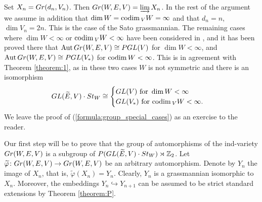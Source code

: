 \documentclass[11pt, a4paper]{article}
\begin{document}
 Set $X_n=Gr(d_n,V_n)$. Then $Gr(W,E,V)=\varinjlim X_n$. In the rest of the argument we assume in addition that $\dim W=\mathrm{codim}\,_V W=\infty$ and that $d_n=n$, $\dim V_n=2n$. This is the case of the Sato grassmannian. The remaining cases where $\dim W<\infty$ or $\mathrm{codim}\,_V W<\infty$ have been considered in \cite{Penkov}, and it has been proved there that $\mathrm{Aut}\,Gr(W,E,V)\cong P GL(V)$ for $\dim W<\infty$, and $\mathrm{Aut}\,Gr(W,E,V)\cong P GL(V_*)$ for $\mathrm{codim}\, W<\infty$. This is in agreement with Theorem \ref{theorem:1}, as in these two cases $W$ is not symmetric and there is an isomorphism \begin{equation}\label{formula:group_special_cases}
     GL(\widetilde{E},V)\cdot St_W \cong\begin{cases} GL(V) \text{ for } \dim W<\infty \\ GL(V_*) \text{ for } \mathrm{codim}\,_V W<\infty.\end{cases}
 \end{equation} 
We leave the proof of (\ref{formula:group_special_cases}) as an exercise to the reader. %

Our first step will be to prove that the group of automorphisms of the ind-variety $Gr(W,E,V)$ is a subgroup of $P(GL(\widetilde{E},V)\cdot St_W)\rtimes \mathbb{Z}_2$. Let $\widetilde{\varphi}\colon Gr(W,E,V)\rightarrow Gr(W,E,V)$ be an arbitrary automorphism. Denote by $Y_n$ the image of $X_n$, that is, $\widetilde{\varphi}(X_n)=Y_n$. Clearly, $Y_n$ is a grassmannian isomorphic to $X_n$. Moreover, the embeddings $Y_n\hookrightarrow Y_{n+1}$ can be assumed to be strict standard extensions by Theorem \ref{theorem:P}. %
\end{document}
